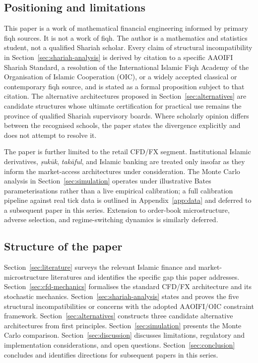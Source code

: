 \documentclass[preprint,12pt,authoryear]{elsarticle}
\theoremstyle{definition}
\begin{document}
\subsection{Positioning and limitations}
\label{sec:positioning}

This paper is a work of mathematical financial engineering informed by
primary fiqh sources. It is not a work of fiqh. The author is a
mathematics and statistics student, not a qualified Shariah scholar.
Every claim of structural incompatibility in
Section~\ref{sec:shariah-analysis} is derived by citation to a specific
AAOIFI Shariah Standard, a resolution of the International Islamic Fiqh
Academy of the Organisation of Islamic Cooperation (OIC), or a widely
accepted classical or contemporary fiqh source, and is stated as a
formal proposition subject to that citation. The alternative
architectures proposed in Section~\ref{sec:alternatives} are candidate
structures whose ultimate certification for practical use remains the
province of qualified Shariah supervisory boards. Where scholarly
opinion differs between the recognised schools, the paper states the
divergence explicitly and does not attempt to resolve it.

The paper is further limited to the retail CFD/FX segment.
Institutional Islamic derivatives, \emph{\d{s}uk\={u}k},
\emph{tak\={a}ful}, and Islamic banking are treated only insofar as
they inform the market-access architectures under consideration. The
Monte Carlo analysis in Section~\ref{sec:simulation} operates under
illustrative Bates parameterisations rather than a live empirical
calibration; a full calibration pipeline against real tick data is
outlined in Appendix~\ref{app:data} and deferred to a subsequent
paper in this series. Extension to order-book microstructure,
adverse selection, and regime-switching dynamics is similarly
deferred.

\subsection{Structure of the paper}
\label{sec:structure}

Section~\ref{sec:literature} surveys the relevant Islamic finance and
market-microstructure literatures and identifies the specific gap this
paper addresses. Section~\ref{sec:cfd-mechanics} formalises the
standard CFD/FX architecture and its stochastic mechanics.
Section~\ref{sec:shariah-analysis} states and proves the five
structural incompatibilities or concerns with the adopted
AAOIFI/OIC constraint framework.
Section~\ref{sec:alternatives} constructs three candidate alternative
architectures from first principles. Section~\ref{sec:simulation}
presents the Monte Carlo comparison. Section~\ref{sec:discussion}
discusses limitations, regulatory and implementation considerations,
and open questions. Section~\ref{sec:conclusion} concludes and
identifies directions for subsequent papers in this series.
\end{document}
